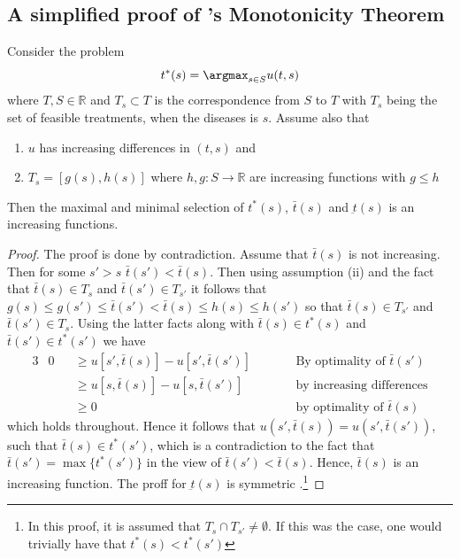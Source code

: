 \documentclass[11pt,a4paper,oneside]{article}
\begin{document}
\begin{appendices}
\subsection[A simplified proof of Topkis’s Monotonicity Theorem is]{A simplified proof of 's Monotonicity Theorem}\label{app:topiks-proof}
\begin{theorem}
	Consider the problem
	\[
		t^*(s)=\argmax_{s\in S} u(t,s)
	\]
	where \(T,S\in \mathbb{R}\) and \(T_s\subset T\) is the correspondence from \(S\) to \(T\)  with \(T_s\) being the set of feasible treatments, when the diseases is \(s\).  Assume also that
	\begin{enumerate}[label=(\roman*)]
		\item \(u\) has increasing differences in \((t,s)\)  and
		\item \(T_s=[g(s),h(s)]\)  where \(h,g:S \rightarrow \mathbb{R}\) are increasing functions with \(g\leq h\)
	\end{enumerate}
	Then the maximal and minimal selection of \(t^*(s)\), \(\bar{t}(s)\) and \(\underbar{t}(s)\) is an increasing functions.
\end{theorem}

\begin{proof}
	The proof is done by contradiction. Assume that \(\bar{t}(s)\) is not increasing. Then for some \(s'>s\)  \(\bar{t}(s')<\bar{t}(s)\).  Then using assumption (ii) and the fact that \(\bar{t}(s)\in T_s\)  and \(\bar{t}(s')\in T_{s'}\)  it follows that \(g(s)\leq g(s')\leq \bar{t}(s') < \bar{t}(s) \leq h(s) \leq h(s')\)  so that \(\bar{t}(s)\in T_{s'}\) and \(\bar{t}(s')\in T_s\).  Using the latter facts along with \(\bar{t}(s)\in t^*(s)\) and \(\bar{t}(s')\in t^*(s')\)  we have
	\begin{alignat*}{3}
	   & 0 && \geq u[s',\bar{t}(s)]-u[s',\bar{t}(s')] && \qquad \text{By optimality of } \bar{t}(s') \\
	   &   && \geq u[s,\bar{t}(s)]-u[s,\bar{t}(s')]   && \qquad \text{by increasing differences} \\
	   &   && \geq 0                                  && \qquad \text{by optimality of } \bar{t}(s)
	\end{alignat*}
	which holds throughout. Hence it follows that \(u(s',\bar{t}(s))=u(s',\bar{t}(s'))\), such that \(\bar{t}(s)\in t^*(s')\), which is a contradiction to the fact that \(\bar{t}(s')=\max \{t^*(s')\}\) in the view of \(\bar{t}(s')<\bar{t}(s)\).  Hence, \(\bar{t}(s)\) is an increasing function. The proff for \(\underbar{t}(s)\) is symmetric \parencite{Amir2005}.\footnote{In this proof, it is assumed that \(T_s\cap T_{s'}\ne \emptyset\). If this was the case, one would trivially have that \(t^*(s)<t^*(s')\)}
\end{proof}
\end{appendices}
\end{document}
